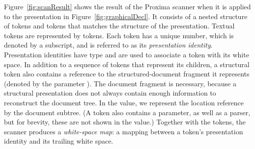 \documentclass[12pt]{article}
\begin{document}
Figure~\ref{fig:scanResult} shows the result of the Proxima scanner when it is applied to the presentation in Figure~\ref{fig:graphicalDecl}. It consists of a nested structure of  tokens and  tokens that matches the structure of the presentation. Textual tokens are represented by  tokens. Each token has a unique number, which is denoted by a subscript, and is referred to as its {\em presentation identity}. Presentation identities have type  and are used to associate a token with its white space. In addition to a sequence of tokens that represent its children, a structural token also contains a reference to the structured-document fragment it represents (denoted by the parameter ). The document fragment is necessary, because a structural presentation does not always contain enough information to reconstruct the document tree. In the  value, we represent the location reference by the document subtree. (A  token also contains a  parameter, as well as a parser, but for brevity, these are not shown in the value.) Together with the tokens, the scanner produces a {\em white-space map}: a mapping between a token's presentation identity and its trailing white space.
\end{document}
